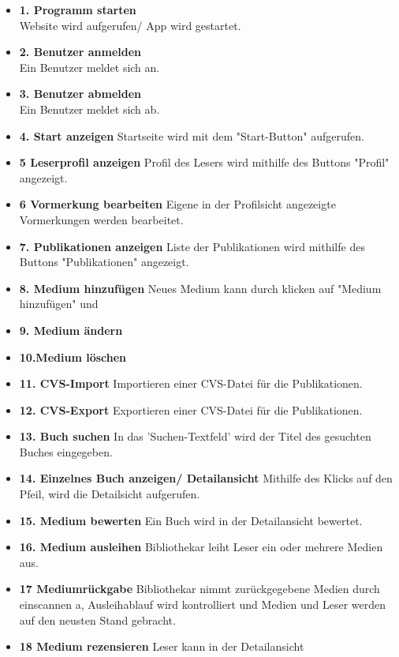 \documentclass[fontsize=12pt,paper=a4,twoside]{scrartcl}
\begin{document}
\begin{itemize}
  \item \textbf{1. Programm starten}\\
  Website wird aufgerufen/ App wird gestartet. 
  \item \textbf{2. Benutzer anmelden}\\
  Ein Benutzer meldet sich an.
  \item \textbf{3. Benutzer abmelden} \\
  Ein Benutzer meldet sich ab.
  \item \textbf{4. Start anzeigen}
  Startseite wird mit dem "Start-Button"         
  aufgerufen.
  \item \textbf{5 Leserprofil anzeigen}
  Profil des Lesers wird mithilfe des 
  Buttons "Profil" angezeigt.
  \item \textbf{6 Vormerkung bearbeiten}
  Eigene in der Profilsicht angezeigte     
  Vormerkungen werden bearbeitet.
  \item \textbf{7. Publikationen anzeigen}
  Liste der Publikationen wird mithilfe
  des Buttons "Publikationen" angezeigt.
  \item \textbf{8. Medium hinzufügen}
  Neues Medium kann durch klicken auf 
  "Medium hinzufügen" und 
  \item \textbf{9. Medium ändern}
  \item \textbf{10.Medium löschen}
  \item \textbf{11. CVS-Import}
  Importieren einer CVS-Datei für 
  die Publikationen.
  \item \textbf{12. CVS-Export}
  Exportieren einer CVS-Datei für die
  Publikationen.
  \item \textbf{13. Buch suchen}
  In das 'Suchen-Textfeld' wird 
  der Titel des gesuchten Buches eingegeben.
  \item \textbf{14. Einzelnes Buch anzeigen/ Detailansicht}
  Mithilfe des Klicks auf den Pfeil, wird 
  die Detailsicht aufgerufen.
  \item \textbf{15. Medium bewerten}
  Ein Buch wird in der Detailansicht 
  bewertet.
  \item \textbf{16. Medium ausleihen}
  Bibliothekar leiht Leser ein oder 
  mehrere Medien aus.
  \item \textbf{17 Mediumrückgabe}
  Bibliothekar nimmt zurückgegebene
  Medien durch einscannen a, Ausleihablauf
  wird kontrolliert und Medien und Leser 
  werden auf den neusten Stand gebracht.  
  \item \textbf{18 Medium rezensieren}
  Leser kann in der Detailansicht 

\end{itemize}
\end{document}
